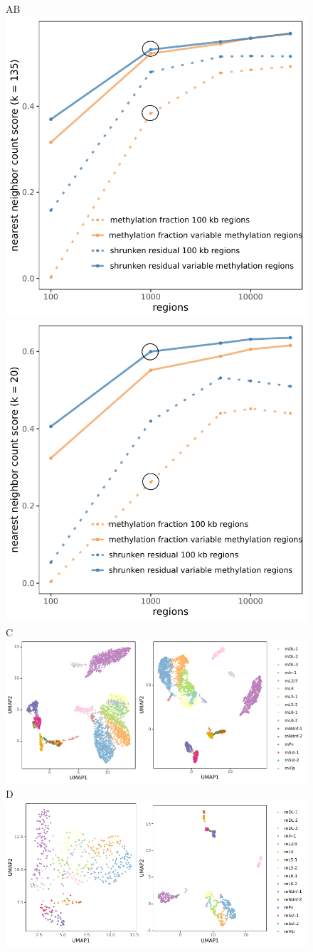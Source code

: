 \documentclass[twocolumn,10pt]{article}
\begin{document}
\begin{figure}
    \begin{center}
    A\hspace{.4\textwidth}B\hspace*{.3\textwidth}~\\
    \hspace{.3cm}\includegraphics[width=.35\textwidth]{part_leonie_git/leonie_plots/complete_135k_12cm_log.pdf}
    \hspace{1cm}\includegraphics[width=.35\textwidth]{part_leonie_git/leonie_plots/cell500_20k_12cm_log.pdf}\\
    C\hspace*{.7\textwidth}~\\
    \hspace{.3cm}\includegraphics[width=.75\textwidth]{part_leonie_git/leonie_plots/UMAP_fulldataset.pdf}\\
    D\hspace*{.7\textwidth}~\\
    \hspace{.3cm}\includegraphics[width=.75\textwidth]{part_leonie_git/leonie_plots/UMAP_reduceddataset.pdf}

\end{center}
\end{figure}
\end{document}
